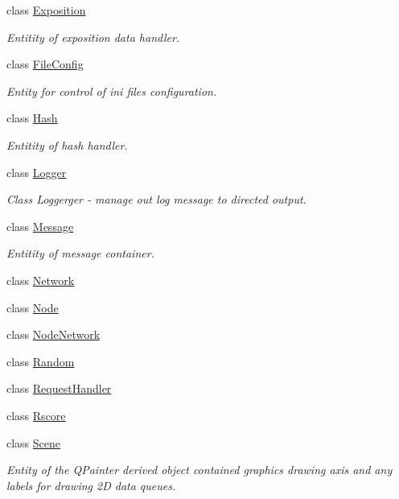 \begin{DoxyCompactItemize}
class \mbox{\hyperlink{classeven_1_1_exposition}{Exposition}}
\begin{DoxyCompactList}\small\item\em Entitity of exposition data handler. \end{DoxyCompactList}\item 
class \mbox{\hyperlink{classeven_1_1_file_config}{File\+Config}}
\begin{DoxyCompactList}\small\item\em Entity for control of ini files configuration. \end{DoxyCompactList}\item 
class \mbox{\hyperlink{classeven_1_1_hash}{Hash}}
\begin{DoxyCompactList}\small\item\em Entitity of hash handler. \end{DoxyCompactList}\item 
class \mbox{\hyperlink{classeven_1_1_logger}{Logger}}
\begin{DoxyCompactList}\small\item\em Class Loggerger -\/ manage out log message to directed output. \end{DoxyCompactList}\item 
class \mbox{\hyperlink{classeven_1_1_message}{Message}}
\begin{DoxyCompactList}\small\item\em Entitity of message container. \end{DoxyCompactList}\item 
class \mbox{\hyperlink{classeven_1_1_network}{Network}}
\item 
class \mbox{\hyperlink{classeven_1_1_node}{Node}}
\item 
class \mbox{\hyperlink{classeven_1_1_node_network}{Node\+Network}}
\item 
class \mbox{\hyperlink{classeven_1_1_random}{Random}}
\item 
class \mbox{\hyperlink{classeven_1_1_request_handler}{Request\+Handler}}
\item 
class \mbox{\hyperlink{classeven_1_1_rscore}{Rscore}}
\item 
class \mbox{\hyperlink{classeven_1_1_scene}{Scene}}
\begin{DoxyCompactList}\small\item\em Entity of the Q\+Painter derived object contained graphics drawing axis and any labels for drawing 2D data queues. \end{DoxyCompactList}\item 

\end{DoxyCompactItemize}
